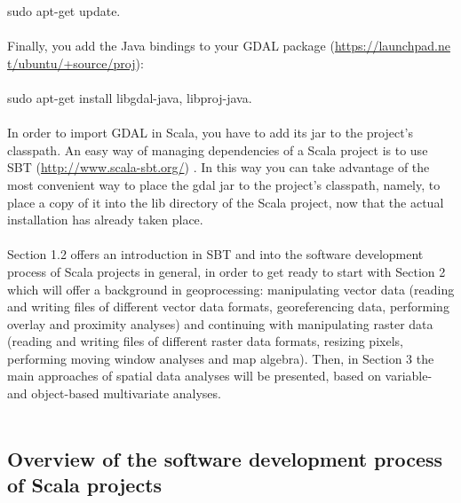 \documentclass {article}
\begin{document}
sudo apt-get update.\\
\\
Finally, you add the Java bindings to your GDAL package (\href{https://launchpad.net/ubuntu/+source/proj}{https://launchpad.ne\\ t/ubuntu/+source/proj}):\\
\\
sudo apt-get install libgdal-java, libproj-java.    \\
\\
In order to import GDAL in Scala, you have to add its jar to the project's classpath. An easy way of managing dependencies of a Scala project is to use SBT (\href{http://www.scala-sbt.org/}{http://www.scala-sbt.org/}) \cite{tesileanu_using_2017} \cite{suereth_sbt_2016}. In this way you can take advantage of the most convenient way to place the gdal jar to the project's classpath, namely, to place a copy of it into the lib directory of the Scala project, now that the actual installation has already taken place.
\\
\\
Section 1.2 offers an introduction in SBT and into the software development process of Scala projects in general, in order to get ready to start with Section 2 which will offer a background in geoprocessing: manipulating vector data (reading and writing files of different vector data formats, georeferencing data, performing overlay and proximity analyses) and continuing with manipulating raster data (reading and writing files of different raster data formats, resizing pixels, performing moving window analyses and map algebra). Then, in Section 3 the main approaches of spatial data analyses will be presented, based on variable- and object-based multivariate analyses.     
\\
\\
\subsection{Overview of the software development process of Scala projects}
\end{document}
